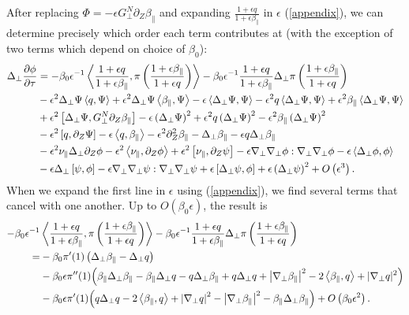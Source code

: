 \documentclass{article}
\newcommand{\para}{\parallel}
\newcommand{\ep}{\epsilon}
\newcommand{\np}{\nabla_\perp}
\newcommand{\lap}{\Delta_\perp}
\newcommand{\p}{\partial}
\newcommand{\deriv}[2]{\frac{\p #1}{\p #2}}
\newcommand{\fr}{\frac{1+\ep q}{1+\ep\beta_\para}}
\newcommand{\frinv}{\frac{1+\ep\beta_\para}{1+\ep q}}
\newcommand{\GN}{G_\perp^N}
\newcommand{\pth} [1] {\left( #1 \right) }
\newcommand{\br} [1] {\left[ #1 \right] }
\begin{document}
After replacing  $\Phi=-\ep\GN\p_Z\beta_\para$ and expanding $\fr$ in $\ep$ (\ref{appendix}), we can determine precisely which order each term contributes at (with the exception of two terms which depend on choice of $\beta_0$): 
\begin{align*}
    \lap\deriv{\phi}{\tau} &= - \beta_0\ep^{-1} \Braket{\fr, \pi\pth{\frinv}} - \beta_0\ep^{-1} \fr\lap\pi\pth{\frinv} \\
    &- \ep^2\lap\Psi \Braket{q,\Psi} + \ep^2\lap\Psi \Braket{\beta_\para,\Psi} - \ep\Braket{\lap\Psi, \Psi} - \ep^2q \Braket{\lap\Psi, \Psi} + \ep^2 \beta_\para\Braket{\lap\Psi, \Psi} \\
    &+ \ep^2\br{\lap\Psi, \GN\p_Z\beta_\para} -\ep\pth{\lap\Psi}^2 + \ep^2q\pth{\lap\Psi}^2 - \ep^2\beta_\para\pth{\lap\Psi}^2 \\
    &- \ep^2\br{q, \p_Z\Psi} - \ep\Braket{q,\beta_\para} - \ep^2\p^2_Z\beta_\para - \lap\beta_\para - \ep q\lap\beta_\para \\
    &- \ep^2\nu_\para \lap\p_Z\phi - \ep^2\Braket{\nu_\para, \p_Z\phi} + \ep^2\br{\nu_\para, \p_Z\psi} - \ep\np\np\phi:\np\np\phi - \ep\Braket{\lap\phi, \phi} \\
    &- \ep\lap\br{\psi,\phi} - \ep\np\np\psi:\np\np\psi + \ep\br{\lap\psi, \phi} + \ep\pth{\lap\psi}^2 + O\pth{\ep^3}.
\end{align*}
When we expand the first line in $\ep$ using (\ref{appendix}), we find several terms that cancel with one another. Up to $O(\beta_0\ep)$, the result is 
\begin{align*}
    - \beta_0\ep^{-1} &\Braket{\fr, \pi\pth{\frinv}} - \beta_0\ep^{-1} \fr\lap\pi\pth{\frinv} \\
    = &-\beta_0\pi'(1) \pth{\lap\beta_\para - \lap q} \\ 
    &- \beta_0\ep \pi''(1) \Bigl( \beta_\para\lap \beta_\para - \beta_\para\lap q - q\lap\beta_\para + q\lap q + \left|\np\beta_\para\right|^2 - 2\Braket{\beta_\para,q} + |\np q|^2 \Bigr) \\ 
    &- \beta_0\ep \pi'(1) \Bigl( q\lap q - 2\Braket{\beta_\para,q} + \left|\np q\right|^2 - \left|\np\beta_\para\right|^2 - \beta_\para\lap\beta_\para \Bigr) + O\pth{\beta_0\ep^2}.
\end{align*}
\end{document}
